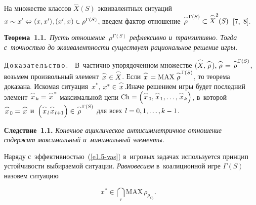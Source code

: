 \begin{multicols}{2}
    \vspace*{-6pt}
    
    На множестве классов $\overset{\frown}{X}(S)$ эквивалентных ситуаций $x\sim x^\prime 
\hm\Leftrightarrow (x,x^\prime), (x^\prime,x)\hm\in \rho^{\Gamma(S)}$, введем  
фак\-тор-от\-но\-ше\-ние $\overset{\frown}{\rho}^{\Gamma(S)} \hm\subset \overset{\frown}{X}^2(S)$~[7,~8].
    
    \smallskip
    
    \noindent
    \textbf{Теорема~1.1.}\ \textit{Пусть отношение~$\rho^{\Gamma(S)}$ 
реф\-лек\-сив\-но и~тран\-зи\-тив\-но. Тогда с~точ\-ностью до эк\-ви\-ва\-лент\-ности существует 
рациональное решение игры.}
    
    \smallskip
    
    \noindent 
    Д\,о\,к\,а\,з\,а\,т\,е\,л\,ь\,с\,т\,в\,о\,.\ \  В~час\-тич\-но упорядоченном 
множестве $(\overset{\frown}{X},\overset{\frown}{\rho}), \overset{\frown}{\rho}\hm= \overset{\frown}{\rho}^{\Gamma(S)}$, 
возьмем произвольный элемент $\overset{\frown}{x}\hm\in \overset{\frown}{X}$. Если $\overset{\frown}{x}\hm= 
\mathrm{MAX}\,\overset{\frown}{\rho}^{\Gamma(S)}$, то тео\-ре\-ма доказана. Искомая ситуация~$x^*$, 
$x^*\hm\in \overset{\frown}{x}$.\linebreak Иначе решением игры будет по\-след\-ний элемент 
$\overset{\frown}{x}_k\hm= \overset{\frown}{x}^*$ максимальной цепи $\mathrm{Ch}\hm= \left( \overset{\frown}{x}_0, 
\overset{\frown}{x}_1, \ldots , \overset{\frown}{x}_k\right)$, в~которой $\overset{\frown}{x}_0\hm= \overset{\frown}{x}$ 
и~$\left( \overset{\frown}{x}_l\overset{\frown}{x}_{l+1}\right)\hm\in \overset{\frown}{\rho}^{\Gamma(S)}$ для всех 
$l\hm= 0, 1, \ldots ,k-1$. 
    
    \smallskip
    
    \noindent
    \textbf{Следствие~1.1.} \textit{Конечное ациклическое ан\-ти\-сим\-мет\-рич\-ное 
отношение содержит максимальный и~минимальный элементы}.
    
    \smallskip
    
    Наряду с~эффективностью~(\ref{e1.5-vas}) в~игровых задачах используется 
принцип устой\-чи\-вости вы\-би\-ра\-емой ситуации. \textit{Равновесием} в~коалиционной 
игре $\Gamma(S)$ назовем ситуацию 

\noindent
    \begin{equation}
    x^* \in \mathop{\bigcap}\limits_r \mathrm{MAX}\,\rho_{\rho_{C_r}}.
    \label{e1.6-vas}
    \end{equation}
    

\end{multicols}
